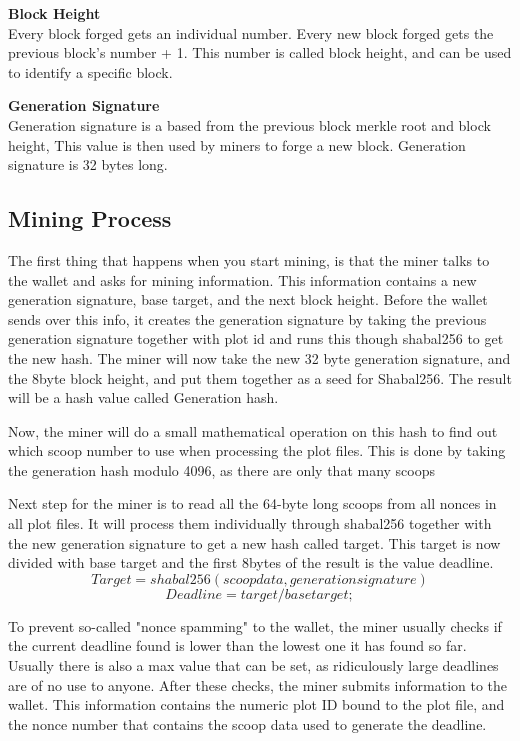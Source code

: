 \begin{flushleft}
    \textbf{Block Height}\\
    Every block forged gets an individual number. Every new block forged gets the previous block's number + 1. This number is called block height, and can be used to identify a specific block.
\end{flushleft}
\begin{flushleft}
    \textbf{Generation Signature}\\
    Generation signature is a based from the previous block merkle root and block height, This value is then used by miners to forge a new block. Generation signature is 32 bytes long.
\end{flushleft}
\subsection{Mining Process}
\begin{flushleft}
    The first thing that happens when you start mining, is that the miner talks to the wallet and asks for mining information. This information contains a new generation signature, base target, and the next block height. Before the wallet sends over this info, it creates the generation signature by taking the previous generation signature together with plot id and runs this though shabal256 to get the new hash. The miner will now take the new 32 byte generation signature, and the 8byte block height, and put them together as a seed for Shabal256. The result will be a hash value called Generation hash.
\end{flushleft}
\begin{flushleft}
    Now, the miner will do a small mathematical operation on this hash to find out which scoop number to use when processing the plot files. This is done by taking the generation hash modulo 4096, as there are only that many scoops
\end{flushleft}
\begin{flushleft}
    Next step for the miner is to read all the 64-byte long scoops from all nonces in all plot files. It will process them individually through shabal256 together with the new generation signature to get a new hash called target. This target is now divided with base target and the first 8bytes of the result is the value deadline.
    \begin{equation}
        Target = shabal256 (scoop data, generation signature)
    \end{equation}
    \begin{equation}
        Deadline = target / base target;
    \end{equation}
\end{flushleft}
\begin{flushleft}
    To prevent so-called "nonce spamming" to the wallet, the miner usually checks if the current deadline found is lower than the lowest one it has found so far. Usually there is also a max value that can be set, as ridiculously large deadlines are of no use to anyone. After these checks, the miner submits information to the wallet. This information contains the numeric plot ID bound to the plot file, and the nonce number that contains the scoop data used to generate the deadline.
\end{flushleft}
